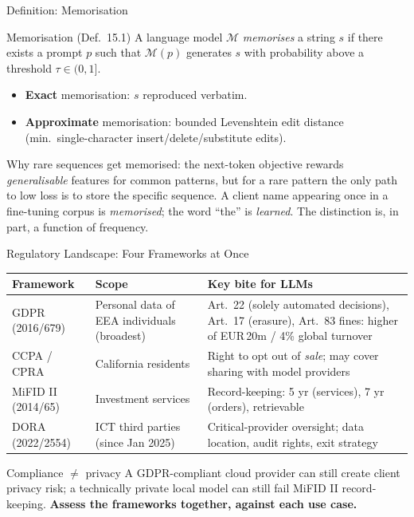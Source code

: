 \documentclass[9pt,t]{beamer}
\begin{document}
\begin{frame}{Definition: Memorisation}
\begin{block}{Memorisation (Def.\ 15.1)}
A language model $\mathcal{M}$ \emph{memorises} a string $s$ if there exists a
prompt $p$ such that $\mathcal{M}(p)$ generates $s$ with probability above a
threshold $\tau \in (0,1]$.
\end{block}

\medskip
\begin{itemize}
  \item \textbf{Exact} memorisation: $s$ reproduced verbatim.
  \item \textbf{Approximate} memorisation: bounded Levenshtein edit distance
        (min.\ single-character insert/delete/substitute edits).
\end{itemize}

\medskip
\begin{underhood}
Why rare sequences get memorised: the next-token objective rewards
\emph{generalisable} features for common patterns, but for a rare pattern the only
path to low loss is to store the specific sequence. A client name appearing once in
a fine-tuning corpus is \emph{memorised}; the word ``the'' is \emph{learned}. The
distinction is, in part, a function of frequency.
\end{underhood}
\end{frame}

\begin{frame}{Regulatory Landscape: Four Frameworks at Once}
\small
\begin{tabular}{p{1.8cm}p{3.0cm}p{5.3cm}}
\toprule
\textbf{Framework} & \textbf{Scope} & \textbf{Key bite for LLMs} \\
\midrule
GDPR (2016/679) & Personal data of EEA individuals (broadest) &
  Art.\ 22 (solely automated decisions), Art.\ 17 (erasure),
  Art.\ 83 fines: higher of EUR\,20m / 4\% global turnover \\
\addlinespace
CCPA / CPRA & California residents &
  Right to opt out of \emph{sale}; may cover sharing with model providers \\
\addlinespace
MiFID II (2014/65) & Investment services &
  Record-keeping: 5 yr (services), 7 yr (orders), retrievable \\
\addlinespace
DORA (2022/2554) & ICT third parties (since Jan 2025) &
  Critical-provider oversight; data location, audit rights, exit strategy \\
\bottomrule
\end{tabular}

\medskip
\normalsize
\begin{alertblock}{Compliance $\neq$ privacy}
A GDPR-compliant cloud provider can still create client privacy risk; a technically
private local model can still fail MiFID II record-keeping. \textbf{Assess the
frameworks together, against each use case.}
\end{alertblock}
\end{frame}
\end{document}
